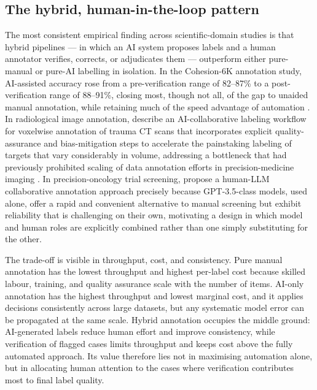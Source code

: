 \documentclass[acmsmall,nonacm]{acmart}
\begin{document}
\subsection{The hybrid, human-in-the-loop pattern}
\label{subsec:human-in-the-loop}

The most consistent empirical finding across scientific-domain studies is that hybrid pipelines --- in which an AI system proposes labels and a human annotator verifies, corrects, or adjudicates them --- outperform either pure-manual or pure-AI labelling in isolation. In the Cohesion-6K annotation study, AI-assisted accuracy rose from a pre-verification range of 82--87\% to a post-verification range of 88--91\%, closing most, though not all, of the gap to unaided manual annotation, while retaining much of the speed advantage of automation \citep{alathba2026cohesion}. In radiological image annotation, \citet{dreizin2023accelerating} describe an AI-collaborative labeling workflow for voxelwise annotation of trauma CT scans that incorporates explicit quality-assurance and bias-mitigation steps to accelerate the painstaking labeling of targets that vary considerably in volume, addressing a bottleneck that had previously prohibited scaling of data annotation efforts in precision-medicine imaging \citep{dreizin2023accelerating}. In precision-oncology trial screening, \citet{chen2025human} propose a human-LLM collaborative annotation approach precisely because GPT-3.5-class models, used alone, offer a rapid and convenient alternative to manual screening but exhibit reliability that is challenging on their own, motivating a design in which model and human roles are explicitly combined rather than one simply substituting for the other.

The trade-off is visible in throughput, cost, and consistency. Pure manual annotation has the lowest throughput and highest per-label cost because skilled labour, training, and quality assurance scale with the number of items. AI-only annotation has the highest throughput and lowest marginal cost, and it applies decisions consistently across large datasets, but any systematic model error can be propagated at the same scale. Hybrid annotation occupies the middle ground: AI-generated labels reduce human effort and improve consistency, while verification of flagged cases limits throughput and keeps cost above the fully automated approach. Its value therefore lies not in maximising automation alone, but in allocating human attention to the cases where verification contributes most to final label quality.
\end{document}
